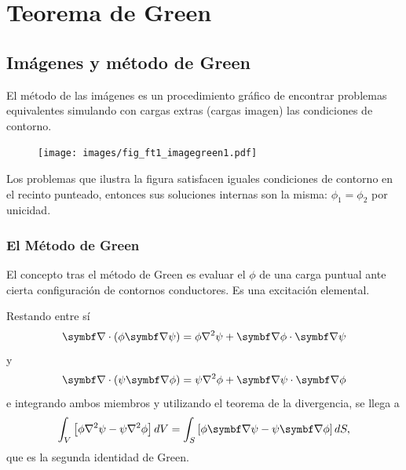 \documentclass[10pt,oneside]{CBFT_book}
\begin{document}
\chapter{Teorema de Green}

\section{Imágenes y método de Green}

El método de las imágenes es un procedimiento gráfico de encontrar problemas equivalentes simulando
con cargas extras (cargas imagen) las condiciones de contorno.

\begin{figure}[htb]
	\begin{center}
	\texttt{[image: images/fig\_ft1\_imagegreen1.pdf]}	 
	\end{center}
	\caption{}
\end{figure} 

Los problemas que ilustra la figura satisfacen iguales condiciones de contorno en el recinto punteado,
entonces sus soluciones internas son la misma: $\phi_1 = \phi_2$ por unicidad.

\subsection{El Método de Green}

El concepto tras el método de Green es evaluar el $\phi$ de una carga puntual ante cierta configuración
de contornos conductores. Es una excitación elemental.

Restando entre sí
\[
	\Nabla\cdot(\phi\Nabla\psi) = \phi\lapm{\psi} + \Nabla\phi\cdot\Nabla\psi
\]
y
\[
	\Nabla\cdot(\psi\Nabla\phi) = \psi\lapm{\phi} + \Nabla\psi\cdot\Nabla\phi
\]
e integrando ambos miembros y utilizando el teorema de la divergencia, se llega a
\[
	\int_V \left[ \phi\lapm{\psi} - \psi\lapm{\phi}\right] dV =
	\int_S \left[ \phi\Nabla\psi - \psi\Nabla\phi \right] dS,
\]
que es la segunda identidad de Green.
\end{document}
